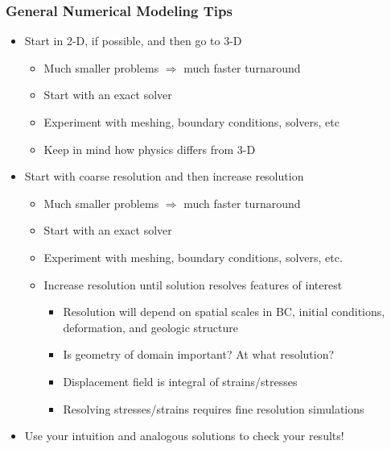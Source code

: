 \documentclass{beamer}
\newcommand{\important}[1]{{\color{red}#1}}
\begin{document}
\begin{frame}
  \frametitle{General Numerical Modeling Tips}
  
  \begin{itemize}
  \item \important{Start in 2-D, if possible, and then go to 3-D}
    \begin{itemize}
    \item Much smaller problems $\Rightarrow$ much faster turnaround
    \item Start with an exact solver
    \item Experiment with meshing, boundary conditions, solvers, etc
    \item Keep in mind how physics differs from 3-D
    \end{itemize}
  \item \important{Start with coarse resolution and then increase resolution}
    \begin{itemize}
    \item Much smaller problems $\Rightarrow$ much faster turnaround
    \item Start with an exact solver
    \item Experiment with meshing, boundary conditions, solvers, etc.
    \item Increase resolution until solution resolves features of interest
      \begin{itemize}
      \item Resolution will depend on spatial scales in BC, initial
        conditions, deformation, and geologic structure
      \item Is geometry of domain important? At what resolution?
      \item Displacement field is integral of strains/stresses
      \item Resolving stresses/strains requires fine resolution simulations
      \end{itemize}
    \end{itemize}
  \item \important{Use your intuition and analogous solutions to check
      your results!}
  \end{itemize}
  
\end{frame}


\end{document}

